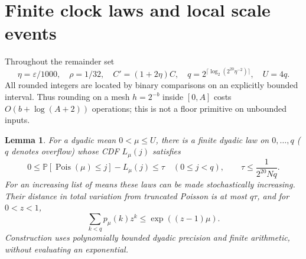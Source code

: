 \documentclass[acmsmall,11pt,screen,nonacm]{acmart}
\newcommand{\Pois}{\operatorname{Pois}}
\newcommand{\Prb}{\mathbb{P}}
\newtheorem{lemma}[theorem]{Lemma}
\begin{document}
\section{Finite clock laws and local scale events}\label{sec:compiler}
Throughout the remainder set
\begin{equation}\label{eq:parameters}
 \eta=\varepsilon/1000,\quad \rho=1/32,\quad C'=(1+2\eta)C,\quad
 q=2^{\lceil\log_2(2^{20}\eta^{-2})\rceil},\quad U=4q.
\end{equation}
All rounded integers are located by binary comparisons on an explicitly bounded interval. Thus rounding on a mesh $h=2^{-b}$ inside $[0,A]$ costs $O(b+\log(A+2))$ operations; this is not a floor primitive on unbounded inputs.

\begin{lemma}\label{lem:compiler}
For a dyadic mean $0<\mu\le U$, there is a finite dyadic law on $0,\ldots,q$ ($q$ denotes overflow) whose CDF $L_\mu(j)$ satisfies
\[
 0\le\Prb[\Pois(\mu)\le j]-L_\mu(j)\le\tau\quad(0\le j<q),
 \qquad \tau\le\frac1{2^{20}Nq}.
\]
For an increasing list of means these laws can be made stochastically increasing. Their distance in total variation from truncated Poisson is at most $q\tau$, and for $0<z<1$,
\begin{equation}\label{eq:pgf}
 \sum_{k<q}p_\mu(k)z^k\le\exp((z-1)\mu).
\end{equation}
Construction uses polynomially bounded dyadic precision and finite arithmetic, without evaluating an exponential.
\end{lemma}
\end{document}
